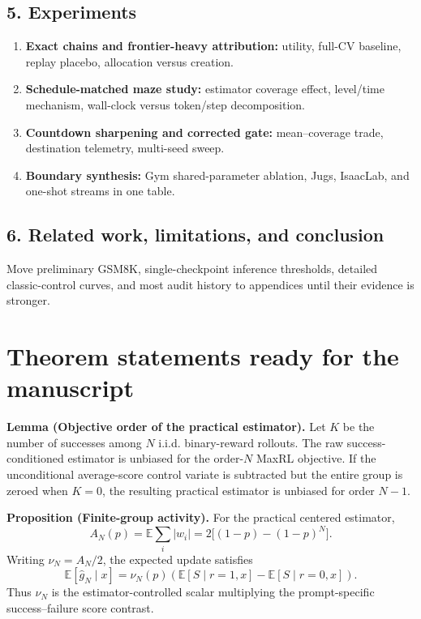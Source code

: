 \documentclass[11pt]{article}
\newcommand{\E}{\mathbb{E}}
\theoremstyle{definition}
\theoremstyle{remark}
\begin{document}
\subsection{5. Experiments}

\begin{enumerate}[leftmargin=2em]
\item \textbf{Exact chains and frontier-heavy attribution:} utility, full-CV baseline, replay placebo, allocation versus creation.
\item \textbf{Schedule-matched maze study:} estimator coverage effect, level/time mechanism, wall-clock versus token/step decomposition.
\item \textbf{Countdown sharpening and corrected gate:} mean--coverage trade, destination telemetry, multi-seed sweep.
\item \textbf{Boundary synthesis:} Gym shared-parameter ablation, Jugs, IsaacLab, and one-shot streams in one table.
\end{enumerate}

\subsection{6. Related work, limitations, and conclusion}

Move preliminary GSM8K, single-checkpoint inference thresholds, detailed classic-control curves, and most audit history to appendices until their evidence is stronger.

\section{Theorem statements ready for the manuscript}

\begin{rewritebox}[title={\textbf{Lemma: practical objective order}}]
\textbf{Lemma (Objective order of the practical estimator).} Let $K$ be the number of successes among $N$ i.i.d. binary-reward rollouts. The raw success-conditioned estimator is unbiased for the order-$N$ MaxRL objective. If the unconditional average-score control variate is subtracted but the entire group is zeroed when $K=0$, the resulting practical estimator is unbiased for order $N-1$.
\end{rewritebox}

\begin{rewritebox}[title={\textbf{Proposition: coefficient mass and factorization}}]
\textbf{Proposition (Finite-group activity).} For the practical centered estimator,
\[
A_N(p)=\E\sum_i|w_i|=2\bigl[(1-p)-(1-p)^N\bigr].
\]
Writing $\nu_N=A_N/2$, the expected update satisfies
\[
\E[\widehat g_N\mid x]
=\nu_N(p)\left(\E[S\mid r=1,x]-\E[S\mid r=0,x]\right).
\]
Thus $\nu_N$ is the estimator-controlled scalar multiplying the prompt-specific success--failure score contrast.
\end{rewritebox}
\end{document}
